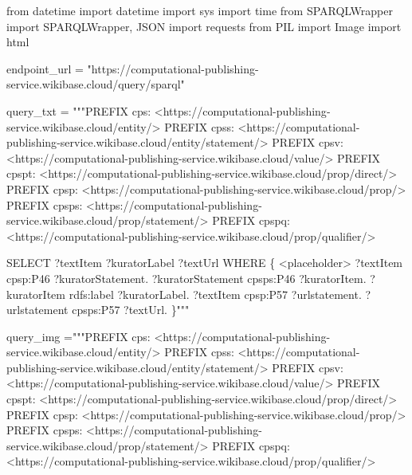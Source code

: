 \documentclass[
  letterpaper,
]{book}
\newenvironment{Shaded}{\begin{snugshade}}{\end{snugshade}}
\newcommand{\ImportTok}[1]{\textcolor[rgb]{0.00,0.46,0.62}{#1}}
\newcommand{\NormalTok}[1]{\textcolor[rgb]{0.00,0.23,0.31}{#1}}
\newcommand{\OperatorTok}[1]{\textcolor[rgb]{0.37,0.37,0.37}{#1}}
\newcommand{\StringTok}[1]{\textcolor[rgb]{0.13,0.47,0.30}{#1}}
\begin{document}
\begin{Shaded}
\begin{Highlighting}[]
\ImportTok{from}\NormalTok{ datetime }\ImportTok{import}\NormalTok{ datetime}
\ImportTok{import}\NormalTok{ sys}
\ImportTok{import}\NormalTok{ time}
\ImportTok{from}\NormalTok{ SPARQLWrapper }\ImportTok{import}\NormalTok{ SPARQLWrapper, JSON}
\ImportTok{import}\NormalTok{ requests}
\ImportTok{from}\NormalTok{ PIL }\ImportTok{import}\NormalTok{ Image}
\ImportTok{import}\NormalTok{ html}

\NormalTok{endpoint\_url }\OperatorTok{=} \StringTok{"https://computational{-}publishing{-}service.wikibase.cloud/query/sparql"}

\NormalTok{query\_txt }\OperatorTok{=} \StringTok{"""PREFIX cps: \textless{}https://computational{-}publishing{-}service.wikibase.cloud/entity/\textgreater{}}
\StringTok{PREFIX cpss: \textless{}https://computational{-}publishing{-}service.wikibase.cloud/entity/statement/\textgreater{}}
\StringTok{PREFIX cpsv: \textless{}https://computational{-}publishing{-}service.wikibase.cloud/value/\textgreater{}}
\StringTok{PREFIX cpspt: \textless{}https://computational{-}publishing{-}service.wikibase.cloud/prop/direct/\textgreater{}}
\StringTok{PREFIX cpsp: \textless{}https://computational{-}publishing{-}service.wikibase.cloud/prop/\textgreater{}}
\StringTok{PREFIX cpsps: \textless{}https://computational{-}publishing{-}service.wikibase.cloud/prop/statement/\textgreater{}}
\StringTok{PREFIX cpspq: \textless{}https://computational{-}publishing{-}service.wikibase.cloud/prop/qualifier/\textgreater{}}


\StringTok{SELECT ?textItem ?kuratorLabel ?textUrl}
\StringTok{WHERE}
\StringTok{\{}
\StringTok{  \textless{}placeholder\textgreater{}}
\StringTok{  ?textItem cpsp:P46 ?kuratorStatement. }
\StringTok{  ?kuratorStatement cpsps:P46 ?kuratorItem. }
\StringTok{  ?kuratorItem rdfs:label ?kuratorLabel.}
\StringTok{  ?textItem cpsp:P57 ?urlstatement. }
\StringTok{  ?urlstatement cpsps:P57 ?textUrl. }
\StringTok{\}"""}

\NormalTok{query\_img }\OperatorTok{=}\StringTok{"""PREFIX cps: \textless{}https://computational{-}publishing{-}service.wikibase.cloud/entity/\textgreater{}}
\StringTok{PREFIX cpss: \textless{}https://computational{-}publishing{-}service.wikibase.cloud/entity/statement/\textgreater{}}
\StringTok{PREFIX cpsv: \textless{}https://computational{-}publishing{-}service.wikibase.cloud/value/\textgreater{}}
\StringTok{PREFIX cpspt: \textless{}https://computational{-}publishing{-}service.wikibase.cloud/prop/direct/\textgreater{}}
\StringTok{PREFIX cpsp: \textless{}https://computational{-}publishing{-}service.wikibase.cloud/prop/\textgreater{}}
\StringTok{PREFIX cpsps: \textless{}https://computational{-}publishing{-}service.wikibase.cloud/prop/statement/\textgreater{}}
\StringTok{PREFIX cpspq: \textless{}https://computational{-}publishing{-}service.wikibase.cloud/prop/qualifier/\textgreater{}}


\end{Highlighting}
\end{Shaded}
\end{document}
